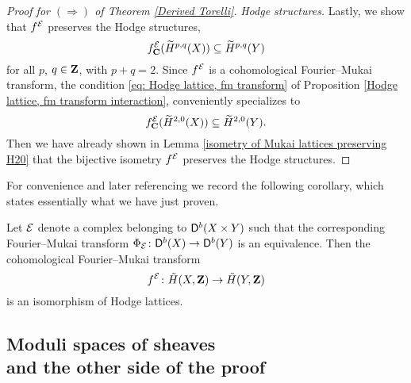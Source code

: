 \begin{proof}[Proof for $(\Rightarrow)$ of Theorem \ref{Derived Torelli}]
    \noindent
    \textsl{Hodge structures.}
    Lastly, we show that $f^{\mathcal E}$ preserves the Hodge structures, \ie
    \[
        f^{\mathcal E}_\mathbf C(\widetilde{H}^{p,q}(X)) \subseteq \widetilde{H}^{p,q}(Y) 
    \]
    for all $p$, $q \in \mathbf Z$, with $p + q = 2$. 
    Since $f^{\mathcal E}$ is a cohomological Fourier--Mukai transform, the condition \eqref{eq: Hodge lattice, fm transform} of Proposition \ref{Hodge lattice, fm transform interaction}, conveniently specializes to 
    \begin{equation}
        f^{\mathcal E}_\mathbf C(\widetilde{H}^{2,0}(X)) \subseteq \widetilde{H}^{2,0}(Y).
    \end{equation}
    Then we have already shown in Lemma \ref{isometry of Mukai lattices preserving H20} that the bijective isometry $f^{\mathcal E}$ preserves the Hodge structures. \qedhere
\end{proof}

For convenience and later referencing we record the following corollary, which states essentially what we have just proven. 

\begin{corollary}
    \label{FM equivalence implies FM on Mukai is an isomorphism}
    Let $\mathcal E$ denote a complex belonging to $\mathsf{D}^b(X \times Y)$ such that the corresponding Fourier--Mukai transform $\Phi_{\mathcal E} \colon \mathsf{D}^b(X) \to \mathsf{D}^b(Y)$ is an equivalence. Then the cohomological Fourier--Mukai transform
    \[
        f^{\mathcal E} \colon \,\tilde{\!{H}}(X, \mathbf Z) \to \,\tilde{\!{H}}(Y, \mathbf Z)
    \]
    is an isomorphism of Hodge lattices.
\end{corollary}




\subsection[Moduli spaces of sheaves and the other side of the proof]{\texorpdfstring{Moduli spaces of sheaves \\ and the other side of the proof}{Moduli spaces of sheaves and the other side of the proof}
}

